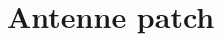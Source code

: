 \documentclass[Deriaz_Traiber_Labo02]{subfiles}
\begin{document}
\section{Antenne patch}
\end{document}
